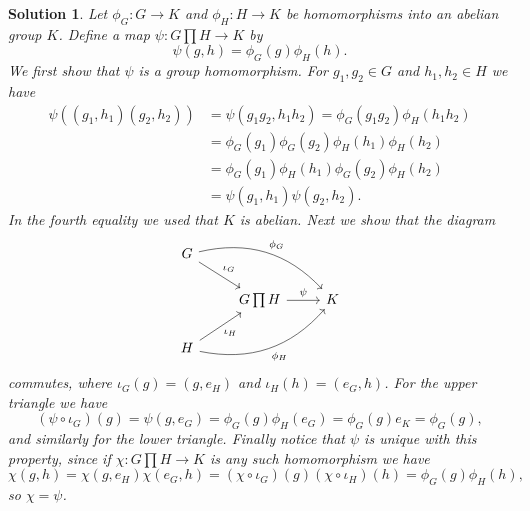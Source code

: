 \documentclass[article, a4paper, 11pt, oneside]{memoir}
\numberwithin{equation}{chapter}
\theoremstyle{nonumberplain}
\newtheorem{solution}{Solution}
\begin{document}
\begin{solution}
    Let $\phi_G \colon G \to K$ and $\phi_H \colon H \to K$ be homomorphisms into an abelian group $K$. Define a map $\psi \colon G \prod H \to K$ by
    \begin{equation*}
        \psi(g,h)
            = \phi_G(g) \phi_H(h).
    \end{equation*}
    We first show that $\psi$ is a group homomorphism. For $g_1,g_2 \in G$ and $h_1, h_2 \in H$ we have
    \begin{align*}
        \psi((g_1,h_1)(g_2,h_2))
            &= \psi(g_1 g_2, h_1 h_2)
             = \phi_G(g_1 g_2) \phi_H(h_1 h_2) \\
            &= \phi_G(g_1) \phi_G(g_2) \phi_H(h_1) \phi_H(h_2) \\
            &= \phi_G(g_1) \phi_H(h_1) \phi_G(g_2) \phi_H(h_2) \\
            &= \psi(g_1, h_1) \psi(g_2, h_2).
    \end{align*}
    In the fourth equality we used that $K$ is abelian. Next we show that the diagram
    \begin{equation*}
        \begin{tikzcd}
            G
                \ar[dr, "\iota_G"]
                \ar[drr, "\phi_G", bend left] \\
            & G \prod H
                \ar[r, "\psi"]
            & K \\
            H
                \ar[ur, "\iota_H", swap]
                \ar[urr, "\phi_H", bend right, swap]
        \end{tikzcd}
    \end{equation*}
    commutes, where $\iota_G(g) = (g, e_H)$ and $\iota_H(h) = (e_G, h)$. For the upper triangle we have
    \begin{equation*}
        (\psi \circ \iota_G)(g)
            = \psi(g, e_G)
            = \phi_G(g) \phi_H(e_G)
            = \phi_G(g) e_K
            = \phi_G(g),
    \end{equation*}
    and similarly for the lower triangle. Finally notice that $\psi$ is unique with this property, since if $\chi \colon G \prod H \to K$ is any such homomorphism we have
    \begin{equation*}
        \chi(g,h)
            = \chi(g,e_H) \chi(e_G,h)
            = (\chi \circ \iota_G)(g) (\chi \circ \iota_H)(h)
            = \phi_G(g) \phi_H(h),
    \end{equation*}
    so $\chi = \psi$.
\end{solution}
\end{document}
